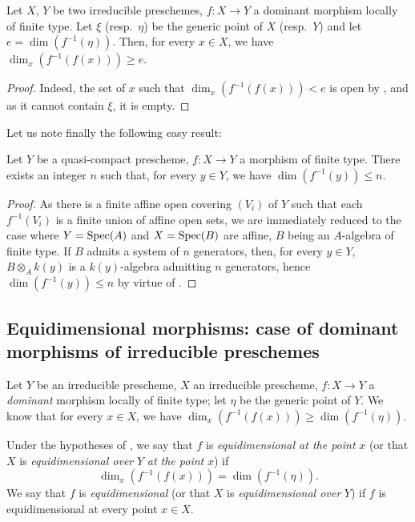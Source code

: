 \begin{corollary}[13.1.6]
\label{IV.13.1.6}
Let $X$, $Y$ be two irreducible preschemes, $f:X\to Y$ a dominant morphism locally of finite type.
Let $\xi$ (resp.\ $\eta$) be the generic point of $X$ (resp.\ $Y$) and let $e=\dim(f^{-1}(\eta))$.
Then, for every $x\in X$, we have $\dim_x(f^{-1}(f(x)))\geq e$.
\end{corollary}

\begin{proof}
Indeed, the set of $x$ such that $\dim_x(f^{-1}(f(x)))<e$ is open by , and as it cannot contain $\xi$, it is empty.
\end{proof}

Let us note finally the following easy result:

\begin{proposition}[13.1.7]
\label{IV.13.1.7}
Let $Y$ be a quasi-compact prescheme, $f:X\to Y$ a morphism of finite type.
There exists an integer $n$ such that, for every $y\in Y$, we have $\dim(f^{-1}(y))\leq n$.
\end{proposition}

\begin{proof}
As there is a finite affine open covering $(V_i)$ of $Y$ such that each $f^{-1}(V_i)$ is a finite union of affine open sets, we are immediately reduced to the case where $Y=\operatorname{Spec}(A)$ and $X=\operatorname{Spec}(B)$ are affine, $B$ being an $A$-algebra of finite type.
If $B$ admits a system of $n$ generators, then, for every $y\in Y$, $B\otimes_A k(y)$ is a $k(y)$-algebra admitting $n$ generators, hence $\dim(f^{-1}(y))\leq n$ by virtue of .
\end{proof}

\subsection{Equidimensional morphisms: case of dominant morphisms of irreducible preschemes}
\label{subsection:IV.13.2}

\begin{env}[13.2.1]
\label{IV.13.2.1}
Let $Y$ be an irreducible prescheme, $X$ an irreducible prescheme, $f:X\to Y$ a \emph{dominant} morphism locally of finite type; let $\eta$ be the generic point of $Y$.
We know  that for every $x\in X$, we have $\dim_x(f^{-1}(f(x)))\geq\dim(f^{-1}(\eta))$.
\end{env}

\begin{definition}[13.2.2]
\label{IV.13.2.2}
Under the hypotheses of , we say that $f$ is \emph{equidimensional at the point} $x$ (or that $X$ is \emph{equidimensional over} $Y$ \emph{at the point} $x$) if
\[
  \dim_x(f^{-1}(f(x)))=\dim(f^{-1}(\eta)).
\]
We say that $f$ is \emph{equidimensional} (or that $X$ is \emph{equidimensional over} $Y$) if $f$ is equidimensional at every point $x\in X$.
\end{definition}

